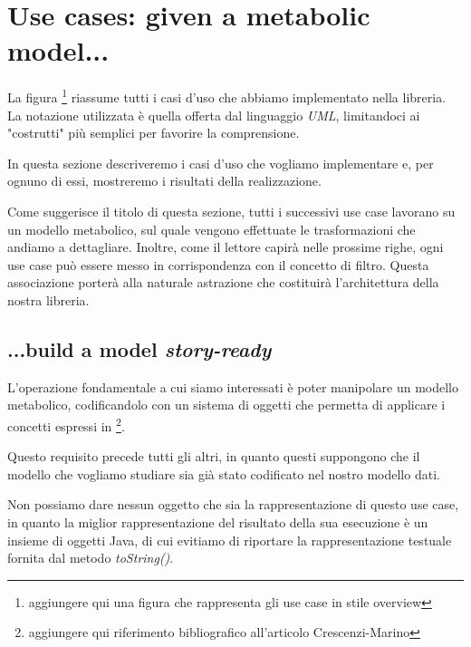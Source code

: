 \section{Use cases: given a metabolic model...}
\label{section:use-cases}

La figura \footnote{aggiungere qui una figura che rappresenta gli use
  case in stile overview} riassume tutti i casi d'uso che abbiamo
implementato nella libreria. La notazione utilizzata \`e quella
offerta dal linguaggio \emph{UML}, limitandoci ai "costrutti" pi\`u
semplici per favorire la comprensione.

In questa sezione descriveremo i casi d'uso che vogliamo implementare
e, per ognuno di essi, mostreremo i risultati della realizzazione.

Come suggerisce il titolo di questa sezione, tutti i successivi use
case lavorano su un modello metabolico, sul quale vengono effettuate
le trasformazioni che andiamo a dettagliare. Inoltre, come il lettore
capir\`a nelle prossime righe, ogni use case pu\`o essere messo in
corrispondenza con il concetto di filtro. Questa associazione
porter\`a alla naturale astrazione che costituir\`a l'architettura
della nostra libreria.

\subsection{...build a model \emph{story-ready}}
L'operazione fondamentale a cui siamo interessati \`e poter manipolare
un modello metabolico, codificandolo con un sistema di oggetti che
permetta di applicare i concetti espressi in \footnote{aggiungere qui
  riferimento bibliografico all'articolo Crescenzi-Marino}.

Questo requisito precede tutti gli altri, in quanto questi suppongono
che il modello che vogliamo studiare sia gi\`a stato codificato nel
nostro modello dati.

Non possiamo dare nessun oggetto che sia la rappresentazione di questo
use case, in quanto la miglior rappresentazione del risultato della
sua esecuzione \`e un insieme di oggetti Java, di cui evitiamo di
riportare la rappresentazione testuale fornita dal metodo
\emph{toString()}.

